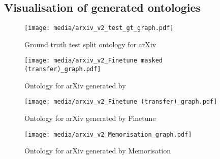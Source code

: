 \newpage
\subsection{Visualisation of generated ontologies} \label{appendix:visualisation}


\begin{figure}[h]
    \centering
    \texttt{[image: media/arxiv\_v2\_test\_gt\_graph.pdf]}
    \caption{Ground truth test split ontology for arXiv}
\end{figure}


\begin{figure}[h]
    \centering
    \texttt{[image: media/arxiv\_v2\_Finetune masked (transfer)\_graph.pdf]}
    \caption{Ontology for arXiv generated by \name}
\end{figure}


\begin{figure}[h]
    \centering
    \texttt{[image: media/arxiv\_v2\_Finetune (transfer)\_graph.pdf]}
    \caption{Ontology for arXiv generated by Finetune}
\end{figure}


\begin{figure}[h]
    \centering
    \texttt{[image: media/arxiv\_v2\_Memorisation\_graph.pdf]}
    \caption{Ontology for arXiv generated by Memorisation}
\end{figure}


